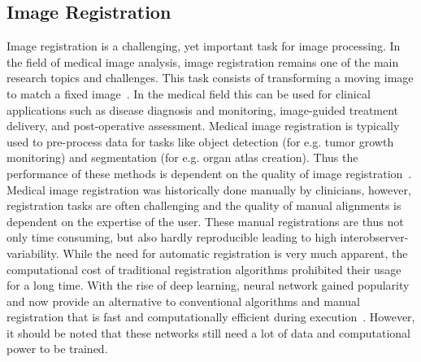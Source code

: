 \subsection{Image Registration} \label{SubSec:ImageRegistration}
Image registration is a challenging, yet important task for image processing. In the field of medical image analysis, image registration remains one of the main research topics and challenges. This task consists of transforming a moving image to match a fixed image~\cite{NiftiReg}. 
In the medical field this can be used for clinical applications such as disease diagnosis and monitoring, image-guided treatment delivery, and post-operative assessment. Medical image registration is typically used to pre-process data for tasks like object detection (for e.g. tumor growth monitoring) and segmentation (for e.g. organ atlas creation).
Thus the performance of these methods is dependent on the quality of image registration~\cite{Chen2020}. \\
Medical image registration was historically done manually by clinicians, however, registration tasks are often challenging and the quality of manual alignments is dependent on the expertise of the user. These manual registrations are thus not only time consuming, but also hardly reproducible leading to high interobserver-variability. While the need for automatic registration is very much apparent, the computational cost of traditional registration algorithms prohibited their usage for a long time. 
With the rise of deep learning, neural network gained popularity and now provide an alternative to conventional algorithms and manual registration that is fast and computationally efficient during execution~\cite{Haskins2020}. However, it should be noted that these networks still need a lot of data and computational power to be trained.\\
